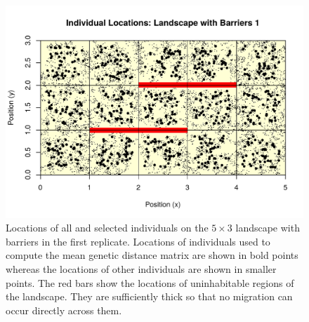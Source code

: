 \documentclass{article}
\begin{document}
\begin{figure}
\centering
     \includegraphics[scale=.8]{figs/ind_locs_5x3b_1}
    \caption{Locations of all and selected individuals on the $5 \times 3$ landscape with barriers
    in the first replicate.
    Locations of individuals used to compute the mean genetic distance matrix are shown in bold points
    whereas the locations of other individuals are shown in smaller points.
    The red bars show the locations of uninhabitable regions of the landscape.
    They are sufficiently thick so that no migration can occur directly across them.}
    \label{fig:ind_locs_5x3b_1}
\end{figure}
\end{document}
